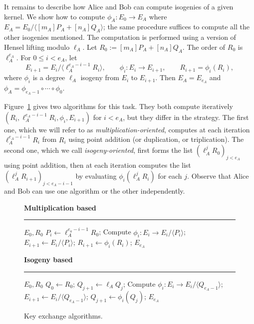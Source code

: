 \documentclass[envcountsect,envcountsame,runningheads]{llncs}   %
\newcommand{\cyc}[1]{{\langle #1 \rangle}}
\begin{document}
It remains to describe how Alice and Bob can compute isogenies of a
given kernel.  We show how to compute
$\phi_A\colon E_0 \to E_A$ where $E_A = E_0/\cyc{[m_A]P_A +
  [n_A]Q_A}$; the same procedure suffices to compute all the other
isogenies mentioned. The computation is performed using a version of
Hensel lifting modulo $\ell_A$. Let $R_0 := [m_A]P_A + [n_A]Q_A$. 
The order of $R_0$ is $\ell_A^{e_A}$. For $0\le i <e_A$, let
\begin{equation*}
  E_{i+1} = E_i/\cyc{\ell_A^{e_A-i-1}R_i},\qquad
  \phi_i : E_i \to E_{i+1},\qquad
  R_{i+1} = \phi_i(R_i),
\end{equation*}
where $\phi_i$ is a degree $\ell_A$ isogeny from $E_i$ to $E_{i+1}$.
Then $E_A = E_{e_A}$ and
$\phi_A=\phi_{e_A-1}\circ\cdots\circ\phi_0$.

Figure~\ref{fig:kea} gives two algorithms for this task. They both
compute iteratively $(R_i,\ell_A^{e_A-i-1}R_i,\phi_i,E_{i+1})$ for
$i<e_A$, but they differ in the strategy. The first one, which we will
refer to as \emph{multiplication-oriented}, computes at each iteration
$\ell_A^{e_A-i-1}R_i$ from $R_i$ using point addition (or duplication,
or triplication). The second one, which we call
\emph{isogeny-oriented}, first forms the list $(\ell_A^jR_0)_{j<e_A}$
using point addition, then at each iteration computes the list
$(\ell_A^jR_{i+1})_{j<e_A-i-1}$ by evaluating $\phi_i(\ell_A^jR_i)$
for each $j$. Observe that Alice and Bob can use one algorithm or the
other independently.

\begin{figure}[t]
  \centering

  \begin{minipage}[t]{0.47\linewidth}
    \textbf{Multiplication based}
    \hrule\smallskip
    \begin{algorithmic}[1]
      \REQUIRE $E_0, R_0$
      \STATE\label{alg:mul:mul} $P_i \leftarrow \ell_A^{e_a-i-1}R_0$;
      \STATE\label{alg:mul:velu} Compute $\phi_i : E_i \to E_i/\cyc{P_i}$;
      \STATE $E_{i+1} \leftarrow E_i/\cyc{P_i}$;
      \STATE\label{alg:mul:eval} $R_{i+1} \leftarrow \phi_i(R_i)$;
      \ENDFOR
      \ENSURE $E_{e_A}$
    \end{algorithmic}
  \end{minipage}
  \hfill
  \begin{minipage}[t]{0.47\linewidth}
    \textbf{Isogeny based}
    \hrule\smallskip
    \begin{algorithmic}[1]
      \REQUIRE $E_0, R_0$
      \STATE $Q_0 \leftarrow R_0$;
      \STATE $Q_{j+1} \leftarrow \ell_AQ_j$;
      \ENDFOR
      \STATE Compute $\phi_i : E_i \to E_i/\cyc{Q_{e_A-1}}$;
      \STATE $E_{i+1} \leftarrow E_i/\cyc{Q_{e_A-1}}$;
      \label{alg:iso:eval}
      \STATE $Q_{j+1} \leftarrow \phi_i(Q_j)$;
      \ENDFOR
      \ENDFOR
      \ENSURE $E_{e_A}$
    \end{algorithmic}
  \end{minipage}
  
  \caption{Key exchange algorithms.}
  \label{fig:kea}
\end{figure}
\end{document}
